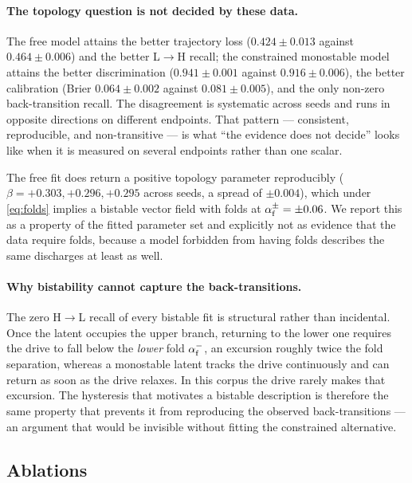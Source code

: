 \paragraph{The topology question is not decided by these data.} The free
model attains the better trajectory loss ($0.424 \pm 0.013$ against
$0.464 \pm 0.006$) and the better L$\to$H recall; the constrained monostable
model attains the better discrimination ($0.941 \pm 0.001$ against
$0.916 \pm 0.006$), the better calibration (Brier $0.064 \pm 0.002$ against
$0.081 \pm 0.005$), and the only non-zero back-transition recall. The
disagreement is systematic across seeds and runs in opposite directions on
different endpoints. That pattern --- consistent, reproducible, and
non-transitive --- is what ``the evidence does not decide'' looks like when
it is measured on several endpoints rather than one scalar.

The free fit does return a positive topology parameter reproducibly
($\beta = +0.303, +0.296, +0.295$ across seeds, a spread of $\pm 0.004$),
which under \eqref{eq:folds} implies a bistable vector field with folds at
$\alpha_{\mathrm{f}}^{\pm} = \pm 0.06$. We report this as a property of the
fitted parameter set and explicitly not as evidence that the data require
folds, because a model forbidden from having folds describes the same
discharges at least as well.

\paragraph{Why bistability cannot capture the back-transitions.} The zero
H$\to$L recall of every bistable fit is structural rather than incidental.
Once the latent occupies the upper branch, returning to the lower one
requires the drive to fall below the \emph{lower} fold
$\alpha_{\mathrm{f}}^{-}$, an excursion roughly twice the fold separation,
whereas a monostable latent tracks the drive continuously and can return as
soon as the drive relaxes. In this corpus the drive rarely makes that
excursion. The hysteresis that motivates a bistable description is therefore
the same property that prevents it from reproducing the observed
back-transitions --- an argument that would be invisible without fitting the
constrained alternative.

\subsection{Ablations}
\label{sec:res-ablations}

